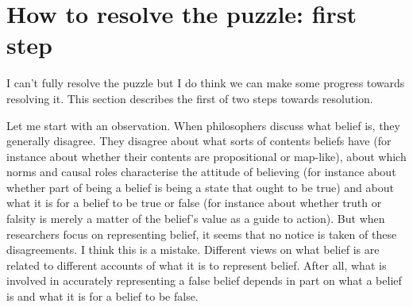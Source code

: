 \documentclass[12pt,\papersize]{extarticle}
\begin{document}
\section{How to resolve the puzzle: first step}
\label{sec:first_step}

I can't fully resolve the puzzle but I do think we can make some progress towards resolving it.  
This section describes the first of two steps towards resolution.

Let me start with an observation.
When philosophers discuss what belief is, they generally disagree.
They disagree about what sorts of contents beliefs have (for instance about whether their contents are propositional or map-like), 
about which norms and causal roles characterise the attitude of believing (for instance about whether part of being a belief is being a state that ought to be true) 
and about what it is for a belief to be true or false (for instance about whether truth or falsity is merely a matter of the belief's value as a guide to action).
But when researchers focus on representing belief, it seems that no notice is taken of these disagreements.
I think this is a mistake.
Different views on what belief is are related to different accounts of what it is to represent belief.
After all, what is involved in accurately representing a false belief depends in part on what a belief is and what it is for a belief to be false.
\end{document}
